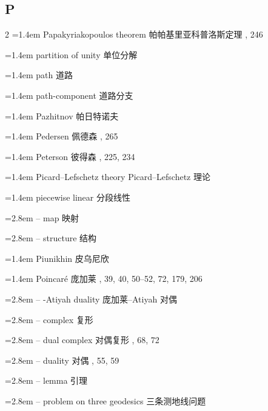 \subsection*{P}
\small
\begin{multicols}{2}
\noindent\hangindent=1.4em Papakyriakopoulos theorem \quad 帕帕基里亚科普洛斯定理 , 246\par
\noindent\hangindent=1.4em partition of unity \quad 单位分解 \par
\noindent\hangindent=1.4em path \quad 道路 \par
\noindent\hangindent=1.4em path-component \quad 道路分支 \par
\noindent\hangindent=1.4em Pazhitnov \quad 帕日特诺夫 \par
\noindent\hangindent=1.4em Pedersen \quad 佩德森 , 265\par
\noindent\hangindent=1.4em Peterson \quad 彼得森 , 225, 234\par
\noindent\hangindent=1.4em Picard--Lefschetz theory \quad Picard--Lefschetz 理论 \par
\noindent\hangindent=1.4em piecewise linear \quad 分段线性 \quad\par
\noindent\hangindent=2.8em -- map \quad 映射 \par
\noindent\hangindent=2.8em -- structure \quad 结构 \par
\noindent\hangindent=1.4em Piunikhin \quad 皮乌尼欣 \par
\noindent\hangindent=1.4em Poincar\'e \quad 庞加莱 , 39, 40, 50--52, 72, 179, 206\par
\noindent\hangindent=2.8em -- -Atiyah duality \quad 庞加莱--Atiyah 对偶 \par
\noindent\hangindent=2.8em -- complex \quad 复形 \par
\noindent\hangindent=2.8em -- dual complex \quad 对偶复形 , 68, 72\par
\noindent\hangindent=2.8em -- duality \quad 对偶 , 55, 59\par
\noindent\hangindent=2.8em -- lemma \quad 引理 \par
\noindent\hangindent=2.8em -- problem on three geodesics \quad 三条测地线问题 \par

\end{multicols}

